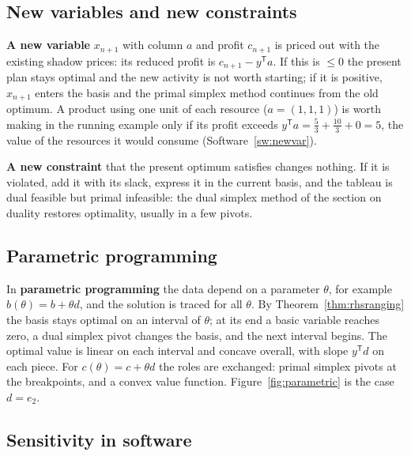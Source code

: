 \documentclass[11pt,a4paper]{article}
\numberwithin{equation}{section}
\theoremstyle{definition}
\begin{document}
\subsection{New variables and new constraints}
\label{ssec:newvars}

\textbf{A new variable} $x_{n + 1}$ with column $a$ and profit $c_{n + 1}$ is priced out with the existing shadow prices: its reduced profit is $c_{n + 1} - y^{\mathsf T}a$. If this is $\leq 0$ the present plan stays optimal and the new activity is not worth starting; if it is positive, $x_{n + 1}$ enters the basis and the
primal simplex method continues from the old optimum. A product using one unit of each resource ($a = (1, 1, 1)$) is worth making in the running example only if its profit exceeds $y^{\mathsf T}a = \frac53 + \frac{10}3 + 0 = 5$, the value of the resources it would consume (Software~\ref{sw:newvar}).

\textbf{A new constraint} that the present optimum satisfies changes nothing. If it is violated, add it with its slack, express it in the current basis, and the tableau is dual feasible but primal infeasible: the dual simplex method of the section on duality restores optimality, usually in a few pivots.

\subsection{Parametric programming}
\label{ssec:parametric}

In \textbf{parametric programming} the data depend on a parameter $\theta$, for example $b(\theta) = b + \theta d$, and the solution is traced for all $\theta$. By Theorem~\ref{thm:rhsranging} the basis stays optimal on an interval of $\theta$; at its end a basic variable reaches zero, a dual simplex pivot changes the basis, and
the next interval begins. The optimal value is linear on each interval and concave overall, with slope $y^{\mathsf T}d$ on each piece. For $c(\theta) = c + \theta d$ the roles are exchanged: primal simplex pivots at the breakpoints, and a convex value function. Figure~\ref{fig:parametric} is the case $d = e_2$.

\subsection{Sensitivity in software}
\label{ssec:software6}
\end{document}
